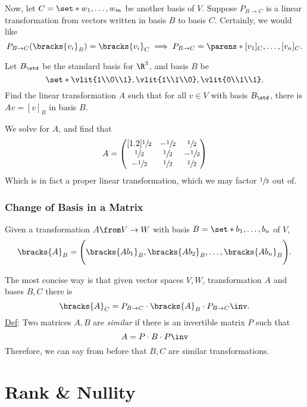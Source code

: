 \documentclass{article}
\begin{document}
Now, let $C = \set*{w_{1}, \ldots, w_{m}}$ be another basis of $V$. Suppose $P_{B \to C}$ is a linear transformation from vectors written
in basis $B$ to basis $C$. Certainly, we would like
\[ P_{B \to C}(\bracks{v_{i}}_{B}) = \bracks{v_{i}}_{C} \implies P_{B \to C} = \parens*{[v_{1}]_{C}, \ldots, [v_{n}]_{C}}. \]

\begin{ex}
  Let $B_{\std}$ be the standard basis for $\R^{3}$, and basis $B$ be
  \[ \set*{\vlit{1\\0\\1}, \vlit{1\\1\\0}, \vlit{0\\1\\1}}. \]
  Find the linear transformation $A$ such that for all $v \in V$ with basis $B_{\std}$, there is $Av = [v]_{B}$ in basis $B$.
\end{ex}
We solve for $A$, and find that
\[ A = \begin{pmatrix}[1.2]
  \sfrac{1}{2} & -\sfrac{1}{2} & \sfrac{1}{2}\\
  \sfrac{1}{2} & \sfrac{1}{2} & -\sfrac{1}{2}\\
  -\sfrac{1}{2} & \sfrac{1}{2} & \sfrac{1}{2}
\end{pmatrix} \]
Which is in fact a proper linear transformation, which we may factor $\sfrac{1}{2}$ out of.

\subsubsection{Change of Basis in a Matrix}
Given a transformation $A\from V \to W$ with basis $B = \set*{b_{1}, \ldots, b_{n}}$ of $V$,
\[ \bracks{A}_{B} = \Bigg(\bracks{Ab_{1}}_{B}, \bracks{Ab_{2}}_{B}, \ldots, \bracks{Ab_{n}}_{B}\Bigg). \]

The most concise way is that given vector spaces $V, W$, transformation $A$ and bases $B, C$ there is
\[ \bracks{A}_{C} = P_{B\to C} \cdot \bracks{A}_{B} \cdot P_{B \to C}\inv. \]
\underline{Def}: Two matrices $A, B$ are \emph{similar} if there is an invertible matrix $P$ such that
\[ A = P \cdot B \cdot P\inv \]
Therefore, we can say from before that $B, C$ are similar transformations.

\section{Rank \& Nullity}
\end{document}
